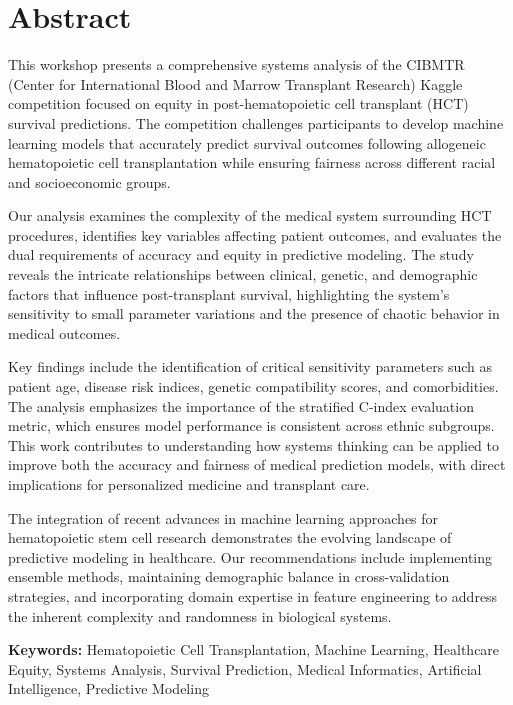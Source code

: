 \chapter*{\center \Large  Abstract}

This workshop presents a comprehensive systems analysis of the CIBMTR (Center for International Blood and Marrow Transplant Research) Kaggle competition focused on equity in post-hematopoietic cell transplant (HCT) survival predictions. The competition challenges participants to develop machine learning models that accurately predict survival outcomes following allogeneic hematopoietic cell transplantation while ensuring fairness across different racial and socioeconomic groups.

\vspace{0.3cm}

Our analysis examines the complexity of the medical system surrounding HCT procedures, identifies key variables affecting patient outcomes, and evaluates the dual requirements of accuracy and equity in predictive modeling. The study reveals the intricate relationships between clinical, genetic, and demographic factors that influence post-transplant survival, highlighting the system's sensitivity to small parameter variations and the presence of chaotic behavior in medical outcomes.

\vspace{0.3cm}

Key findings include the identification of critical sensitivity parameters such as patient age, disease risk indices, genetic compatibility scores, and comorbidities. The analysis emphasizes the importance of the stratified C-index evaluation metric, which ensures model performance is consistent across ethnic subgroups. This work contributes to understanding how systems thinking can be applied to improve both the accuracy and fairness of medical prediction models, with direct implications for personalized medicine and transplant care.

\vspace{0.3cm}

The integration of recent advances in machine learning approaches for hematopoietic stem cell research demonstrates the evolving landscape of predictive modeling in healthcare. Our recommendations include implementing ensemble methods, maintaining demographic balance in cross-validation strategies, and incorporating domain expertise in feature engineering to address the inherent complexity and randomness in biological systems.

\vspace{0.3cm}

\textbf{Keywords:} Hematopoietic Cell Transplantation, Machine Learning, Healthcare Equity, Systems Analysis, Survival Prediction, Medical Informatics, Artificial Intelligence, Predictive Modeling